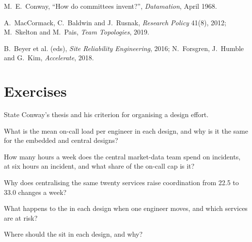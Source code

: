 \begin{omsources}
\item M.~E.~Conway, ``How do committees invent?'', \emph{Datamation}, April 1968.
\item A.~MacCormack, C.~Baldwin and J.~Rusnak, \emph{Research Policy} 41(8), 2012; M.~Skelton and M.~Pais, \emph{Team Topologies}, 2019.
\item B.~Beyer et al. (eds), \emph{Site Reliability Engineering}, 2016; N.~Forsgren, J.~Humble and G.~Kim, \emph{Accelerate}, 2018.
\end{omsources}

\section{Exercises}

\begin{exercise}[$\star$]\label{exo:fm:engineering-organisation-design:1}
State Conway's thesis and his criterion for organising a design effort.
\end{exercise}

\begin{exercise}[$\star$]\label{exo:fm:engineering-organisation-design:2}
What is the mean on-call load per engineer in each design, and why is it the same for the embedded and central designs?
\end{exercise}

\begin{exercise}[$\star$]\label{exo:fm:engineering-organisation-design:3}
How many hours a week does the central market-data team spend on incidents, at six hours an incident, and what share of the on-call cap is it?
\end{exercise}

\begin{exercise}[$\star\star$]\label{exo:fm:engineering-organisation-design:4}
Why does centralising the same twenty services raise coordination from 22.5 to 33.0 changes a week?
\end{exercise}

\begin{exercise}[$\star\star$]\label{exo:fm:engineering-organisation-design:5}
What happens to the  in each design when one engineer moves, and which services are at risk?
\end{exercise}

\begin{exercise}[$\star\star$]\label{exo:fm:engineering-organisation-design:6}
Where should the  sit in each design, and why?
\end{exercise}

